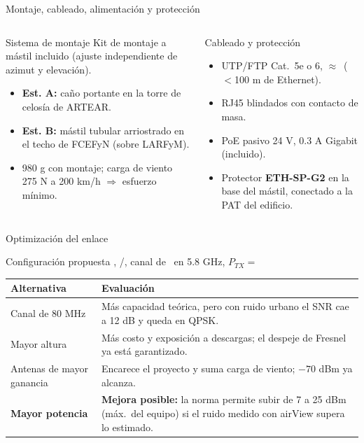 \begin{frame}{Montaje, cableado, alimentación y protección}
  \begin{columns}[T]
    \begin{block}{Sistema de montaje}
      \small
      Kit de montaje a mástil incluido (ajuste independiente de azimut y elevación).
      \begin{itemize}
        \item \textbf{Est. A:} caño portante en la torre de celosía de ARTEAR.
        \item \textbf{Est. B:} mástil tubular arriostrado en el techo de FCEFyN (sobre LARFyM).
        \item 980 g con montaje; carga de viento 275 N a 200 km/h $\Rightarrow$ esfuerzo mínimo.
      \end{itemize}
    \end{block}
    \begin{block}{Cableado y protección}
      \small
      \begin{itemize}
        \item UTP/FTP Cat.\ 5e o 6, $\approx$\EBcable\ ($<$100 m de Ethernet).
        \item RJ45 blindados con contacto de masa.
        \item PoE pasivo 24 V, 0.3 A Gigabit (incluido).
        \item Protector \textbf{ETH-SP-G2} en la base del mástil, conectado a la PAT del edificio.
      \end{itemize}
    \end{block}
  \end{columns}
\end{frame}

\begin{frame}{Optimización del enlace}
  \begin{block}{Configuración propuesta}
    \EBequipo, \EBunoAlt/\EBdosAlt, canal de \EBcanal\ en 5.8 GHz, $P_{TX}=$ \EBptx
  \end{block}
  \small
  \begin{tabularx}{\textwidth}{@{}lL@{}}
    \toprule
    \textbf{Alternativa} & \textbf{Evaluación} \\ \midrule
    Canal de 80 MHz & Más capacidad teórica, pero con ruido urbano el SNR cae a 12 dB y queda en QPSK. \\
    Mayor altura & Más costo y exposición a descargas; el despeje de Fresnel ya está garantizado. \\
    Antenas de mayor ganancia & Encarece el proyecto y suma carga de viento; $-70$ dBm ya alcanza. \\
    \textbf{Mayor potencia} & \textbf{Mejora posible:} la norma permite subir de 7 a 25 dBm (máx.\ del equipo) si el ruido medido con airView supera lo estimado. \\
    \bottomrule
  \end{tabularx}
\end{frame}

